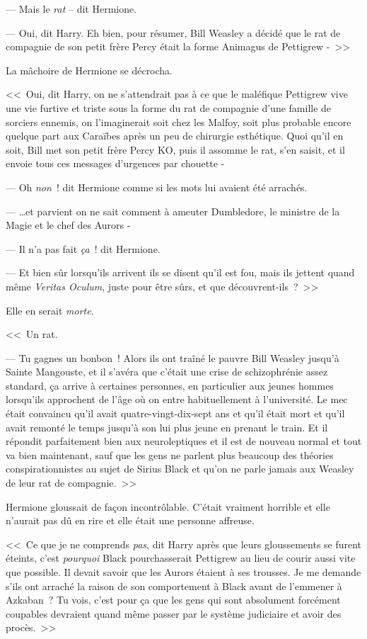 --- Mais le \emph{rat} -- dit Hermione.

--- Oui, dit Harry. Eh bien, pour résumer, Bill Weasley a décidé que le rat de compagnie de son petit frère Percy était la forme Animagus de Pettigrew -~>>

La mâchoire de Hermione se décrocha.

<<~Oui, dit Harry, on ne s'attendrait pas à ce que le maléfique Pettigrew vive une vie furtive et triste sous la forme du rat de compagnie d'une famille de sorciers ennemis, on l'imaginerait soit chez les Malfoy, soit plus probable encore quelque part aux Caraïbes après un peu de chirurgie esthétique. Quoi qu'il en soit, Bill met son petit frère Percy KO, puis il assomme le rat, s'en saisit, et il envoie tous ces messages d'urgences par chouette -

--- Oh \emph{non}~! dit Hermione comme si les mots lui avaient été arrachés.

--- …et parvient on ne sait comment à ameuter Dumbledore, le ministre de la Magie et le chef des Aurors -

--- Il n'a pas fait \emph{ça}~! dit Hermione.

--- Et bien sûr lorsqu'ils arrivent ils se disent qu'il est fou, mais ils jettent quand même \emph{Veritas Oculum}, juste pour être sûrs, et que découvrent-ils~?~>>

Elle en serait \emph{morte}.

<<~Un rat.

--- Tu gagnes un bonbon~! Alors ils ont traîné le pauvre Bill Weasley jusqu'à Sainte Mangouste, et il s'avéra que c'était une crise de schizophrénie assez standard, ça arrive à certaines personnes, en particulier aux jeunes hommes lorsqu'ils approchent de l'âge où on entre habituellement à l'université. Le mec était convaincu qu'il avait quatre-vingt-dix-sept ans et qu'il était mort et qu'il avait remonté le temps jusqu'à son lui plus jeune en prenant le train. Et il répondit parfaitement bien aux neuroleptiques et il est de nouveau normal et tout va bien maintenant, sauf que les gens ne parlent plus beaucoup des théories conspirationnistes au sujet de Sirius Black et qu'on ne parle jamais aux Weasley de leur rat de compagnie.~>>

Hermione gloussait de façon incontrôlable. C'était vraiment horrible et elle n'aurait pas dû en rire et elle était une personne affreuse.

<<~Ce que je ne comprends \emph{pas}, dit Harry après que leurs gloussements se furent éteints, c'est \emph{pourquoi} Black pourchasserait Pettigrew au lieu de courir aussi vite que possible. Il devait savoir que les Aurors étaient à ses trousses. Je me demande s'ils ont arraché la raison de son comportement à Black avant de l'emmener à Azkaban~? Tu vois, c'est pour ça que les gens qui sont absolument forcément coupables devraient quand même passer par le système judiciaire et avoir des procès.~>>

